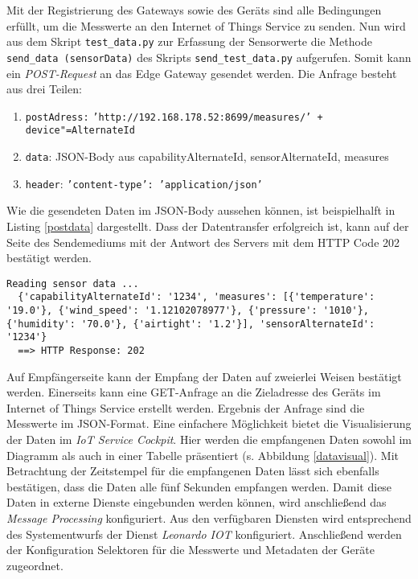 Mit der Registrierung des Gateways sowie des Geräts sind alle Bedingungen erfüllt, um die Messwerte an den Internet of Things Service zu senden. Nun wird aus dem Skript \texttt{test\_data.py} zur Erfassung der Sensorwerte die Methode \texttt{send\_data (sensorData)} des Skripts \texttt{send\_test\_data.py} aufgerufen. Somit kann ein \textit{POST-Request} an das Edge Gateway gesendet werden. Die Anfrage besteht aus drei Teilen:
\begin{enumerate}
  \item \texttt{postAdress:} \texttt{'http://192.168.178.52:8699/measures/' + device"=AlternateId}
  \item \texttt{data}: JSON-Body aus capabilityAlternateId, sensorAlternateId, measures
  \item \texttt{header}: \texttt{'content-type': 'application/json'}
\end{enumerate}

\noindent Wie die gesendeten Daten im JSON-Body aussehen können, ist beispielhalft in Listing \ref{postdata} dargestellt. Dass der Datentransfer erfolgreich ist, kann auf der Seite des Sendemediums mit der Antwort des Servers mit dem HTTP Code 202 bestätigt werden.

\begin{lstlisting}[caption= Das Data-Feld der POST-Anfrage, label=postdata]
  Reading sensor data ...
  {'capabilityAlternateId': '1234', 'measures': [{'temperature': '19.0'}, {'wind_speed': '1.12102078977'}, {'pressure': '1010'}, {'humidity': '70.0'}, {'airtight': '1.2'}], 'sensorAlternateId': '1234'}
  ==> HTTP Response: 202 \end{lstlisting}

\noindent Auf Empfängerseite kann der Empfang der Daten auf zweierlei Weisen bestätigt werden. Einerseits kann eine GET-Anfrage an die Zieladresse des Geräts im Internet of Things Service erstellt werden. Ergebnis der Anfrage sind die Messwerte im JSON-Format. Eine einfachere Möglichkeit bietet die Visualisierung der Daten im \textit{IoT Service Cockpit}. Hier werden die empfangenen Daten sowohl im Diagramm als auch in einer Tabelle präsentiert (s. Abbildung \ref{datavisual}). Mit Betrachtung der Zeitstempel für die empfangenen Daten lässt sich ebenfalls bestätigen, dass die Daten alle fünf Sekunden empfangen werden. Damit diese Daten in externe Dienste eingebunden werden können, wird anschließend das \textit{Message Processing} konfiguriert. Aus den verfügbaren Diensten wird entsprechend des Systementwurfs der Dienst \textit{\glqq Leonardo IOT\grqq{}} konfiguriert. Anschließend werden der Konfiguration Selektoren für die Messwerte und Metadaten der Geräte zugeordnet.

